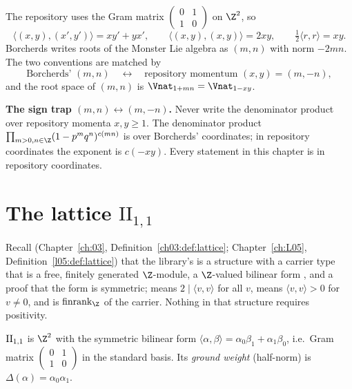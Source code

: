 The repository uses the Gram matrix $\left(\begin{smallmatrix}0&1\\1&0\end{smallmatrix}\right)$ on $\Z^2$, so
\begin{equation*}
  \langle(x,y),(x',y')\rangle = xy'+yx',\qquad \langle(x,y),(x,y)\rangle=2xy,\qquad
  \tfrac12\langle r,r\rangle = xy .
\end{equation*}
Borcherds writes roots of the Monster Lie algebra as $(m,n)$
with norm $-2mn$.  The two conventions are matched by
\begin{equation}\label{ch17:eq:signdict}
  \text{Borcherds' }(m,n)\quad\longleftrightarrow\quad\text{repository momentum }(x,y)=(m,-n),
\end{equation}
and the root space of $(m,n)$ is $\Vnat_{1+mn}=\Vnat_{1-xy}$.

\begin{warning}
\textbf{The sign trap $(m,n)\leftrightarrow(m,-n)$.}  Never write the denominator product over repository momenta
$x,y\ge1$.  The denominator product $\prod_{m>0,n\in\Z}(1-p^mq^n)^{c(mn)}$ is
over Borcherds' coordinates; in repository coordinates the exponent is $c(-xy)$.  Every statement in this
chapter is in repository coordinates.
\end{warning}

\section{The lattice \texorpdfstring{$\mathrm{II}_{1,1}$}{II(1,1)}}\label{ch17:sec:lattice}

Recall (Chapter~\ref{ch:03}, Definition~\ref{ch03:def:lattice}; Chapter~\ref{ch:L05},
Definition~\ref{l05:def:lattice}) that the library's  is a structure with a carrier
type that is a free, finitely generated $\Z$-module, a $\Z$-valued bilinear form , and a proof
 that the form is symmetric;  means $2\mid\langle v,v\rangle$ for all $v$,
 means $\langle v,v\rangle>0$ for $v\ne0$, and  is $\operatorname{finrank}_\Z$ of the
carrier.  Nothing in that structure requires positivity.

\begin{definition}\label{ch17:def:lattice}
${\mathrm{II}_{1,1}}$ is $\Z^2$ with the symmetric bilinear form $\langle\alpha,\beta\rangle=\alpha_0\beta_1+\alpha_1\beta_0$, i.e.\ Gram
matrix $\left(\begin{smallmatrix}0&1\\1&0\end{smallmatrix}\right)$ in the standard basis.  Its \emph{ground weight}
(half-norm) is $\Delta(\alpha)=\alpha_0\alpha_1$.
\end{definition}

